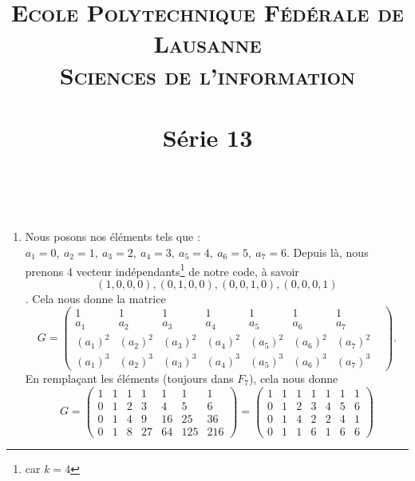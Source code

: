 \documentclass[10p,a4paper]{scrartcl}
\title{	
	\normalfont \normalsize 
	\textsc{Ecole Polytechnique Fédérale de Lausanne} \\ [25pt] %
	\textsc{Sciences de l'information}\\ [0pt] %
	\horrule{0.5pt} \\[0.4cm] %
	\huge Série 13 \\ %
	\horrule{2pt} \\[0.5cm] %
}
\date{}
\renewcommand{\(}{\left(}
\renewcommand{\)}{\right)}
\begin{document}
\maketitle
\setcounter{section}{13}
\subsection{}
\begin{enumerate}
	\item	Nous posons nos éléments tels que : $a_1 = 0,\ a_2 = 1,\ a_3 = 2,\ a_4=3,\ a_5 =4,\ a_6 = 5,\ a_7 = 6$. Depuis là, nous prenons 4 vecteur indépendants\footnote{car $k = 4$} de notre code, à savoir \[(1,0,0,0),(0,1,0,0),(0,0,1,0),(0,0,0,1)\]. Cela nous donne la matrice 
			\[G = 
			\begin{pmatrix}
				1 & 1 & 1 & 1 & 1 & 1 & 1\\
				a_1 & a_2 & a_3 & a_4 & a_5 & a_6 & a_7\\
				(a_1)^2 & (a_2)^2 & (a_3)^2 & (a_4)^2 & (a_5)^2 & (a_6)^2 & (a_7)^2\\
				(a_1)^3 & (a_2)^3 & (a_3)^3 & (a_4)^3 & (a_5)^3 & (a_6)^3 & (a_7)^3 &
			\end{pmatrix}.
			\]
			En remplaçant les éléments (toujours dans $F_7$), cela nous donne 
			\[
			G = 
			\begin{pmatrix}
				1 & 1 & 1 & 1 & 1 & 1 & 1\\
				0 & 1 & 2 & 3 & 4 & 5 & 6\\
				0 & 1 & 4 & 9 & 16 & 25 & 36\\
				0 & 1 & 8 & 27 & 64 & 125 & 216
			\end{pmatrix}
			=
			\begin{pmatrix}
				1 & 1 & 1 & 1 & 1 & 1 & 1\\
				0 & 1 & 2 & 3 & 4 & 5 & 6\\
				0 & 1 & 4 & 2 & 2 & 4 & 1\\
				0 & 1 & 1 & 6 & 1 & 6 & 6
			\end{pmatrix}
			\]
			

\end{enumerate}
\end{document}
